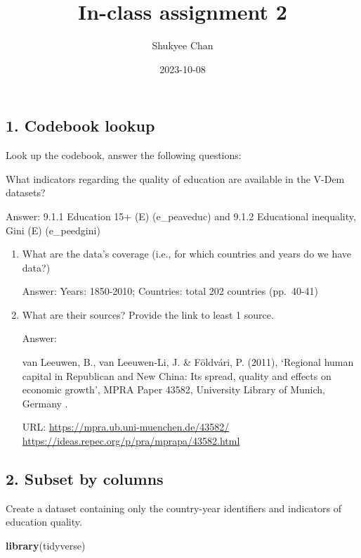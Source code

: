 \documentclass[
]{article}
\title{In-class assignment 2}
\author{Shukyee Chan}
\date{2023-10-08}
\newenvironment{Shaded}{\begin{snugshade}}{\end{snugshade}}
\newcommand{\FunctionTok}[1]{\textcolor[rgb]{0.13,0.29,0.53}{\textbf{#1}}}
\newcommand{\NormalTok}[1]{#1}
\begin{document}
\maketitle

\hypertarget{codebook-lookup}{%
\subsection{1. Codebook lookup}\label{codebook-lookup}}

Look up the codebook, answer the following questions:

What indicators regarding the quality of education are available in the
V-Dem datasets?

Answer: 9.1.1 Education 15+ (E) (e\_peaveduc) and 9.1.2 Educational
inequality, Gini (E) (e\_peedgini)

\begin{enumerate}
\def\labelenumi{\arabic{enumi}.}
\item
  What are the data's coverage (i.e., for which countries and years do
  we have data?)

  Answer: Years: 1850-2010; Countries: total 202 countries (pp.~40-41)
\item
  What are their sources? Provide the link to least 1 source.

  Answer:

  van Leeuwen, B., van Leeuwen-Li, J. \& Földvári, P. (2011), `Regional
  human capital in Republican and New China: Its spread, quality and
  effects on economic growth', MPRA Paper 43582, University Library of
  Munich, Germany .

  URL: \url{https://mpra.ub.uni-muenchen.de/43582/}
  \url{https://ideas.repec.org/p/pra/mprapa/43582.html}
\end{enumerate}

\hypertarget{subset-by-columns}{%
\subsection{\texorpdfstring{2. \textbf{Subset by
columns}}{2. Subset by columns}}\label{subset-by-columns}}

Create a dataset containing only the country-year identifiers and
indicators of education quality.

\begin{Shaded}
\begin{Highlighting}[]
\FunctionTok{library}\NormalTok{(tidyverse)}
\end{Highlighting}
\end{Shaded}
\end{document}
